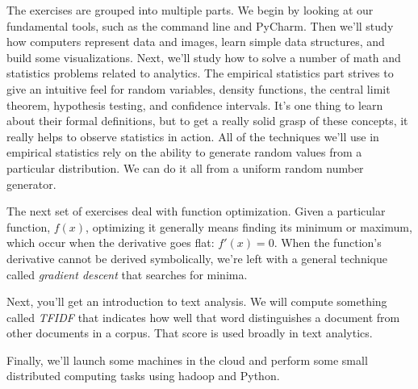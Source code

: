 {\begin{center}
\end{center}
}

The exercises are grouped into multiple parts. We begin by looking at our fundamental tools, such as the command line and PyCharm. Then we'll study how computers represent data and images, learn simple data structures, and build some visualizations. Next, we'll study how to solve a number of math and statistics problems related to analytics. The empirical statistics part strives to give an intuitive feel for random variables, density functions, the central limit theorem, hypothesis testing, and confidence intervals. It's one thing to learn about their formal definitions, but to get a really solid grasp of these concepts, it really helps to observe statistics in action. All of the techniques we'll use in empirical statistics rely on the ability to generate random values from a particular distribution. We can do it all from a uniform random number generator.

The next set of exercises deal with function optimization. Given a particular function, $f(x)$, optimizing it generally means finding its minimum or maximum, which occur when the derivative goes flat: $f'(x) = 0$. When the function's derivative cannot be derived symbolically, we're left with a general technique called {\em gradient descent} that searches for minima.

Next, you'll get an introduction to text analysis. We will compute something called {\em TFIDF} that indicates how well that word distinguishes a document from other documents in a corpus.  That score is used broadly in text analytics.

Finally, we'll launch some machines in the cloud and perform some small distributed computing tasks using hadoop and Python.